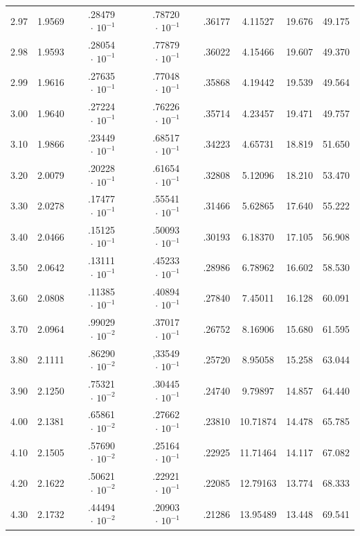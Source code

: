 \begin{minipage}{0.525\textwidth}
{\begin{tabular}{c|c|c|c|c|c|c|c}
        2.97 & 1.9569 & .28479$\,\cdot\,10^{-1}$ & .78720$\,\cdot\,10^{-1}$ & .36177 & 4.11527 & 19.676 & 49.175 \\
        2.98 & 1.9593 & .28054$\,\cdot\,10^{-1}$ & .77879$\,\cdot\,10^{-1}$ & .36022 & 4.15466 & 19.607 & 49.370 \\
        2.99 & 1.9616 & .27635$\,\cdot\,10^{-1}$ & .77048$\,\cdot\,10^{-1}$ & .35868 & 4.19442 & 19.539 & 49.564 \\
        3.00 & 1.9640 & .27224$\,\cdot\,10^{-1}$ & .76226$\,\cdot\,10^{-1}$ & .35714 & 4.23457 & 19.471 & 49.757 \\
        3.10 & 1.9866 & .23449$\,\cdot\,10^{-1}$ & .68517$\,\cdot\,10^{-1}$ & .34223 & 4.65731 & 18.819 & 51.650 \\
        3.20 & 2.0079 & .20228$\,\cdot\,10^{-1}$ & .61654$\,\cdot\,10^{-1}$ & .32808 & 5.12096 & 18.210 & 53.470 \\ \arrayrulecolor{Emerald}\hline\arrayrulecolor{black}
        3.30 & 2.0278 & .17477$\,\cdot\,10^{-1}$ & .55541$\,\cdot\,10^{-1}$ & .31466 & 5.62865 & 17.640 & 55.222 \\
        3.40 & 2.0466 & .15125$\,\cdot\,10^{-1}$ & .50093$\,\cdot\,10^{-1}$ & .30193 & 6.18370 & 17.105 & 56.908 \\
        3.50 & 2.0642 & .13111$\,\cdot\,10^{-1}$ & .45233$\,\cdot\,10^{-1}$ & .28986 & 6.78962 & 16.602 & 58.530 \\
        3.60 & 2.0808 & .11385$\,\cdot\,10^{-1}$ & .40894$\,\cdot\,10^{-1}$ & .27840 & 7.45011 & 16.128 & 60.091 \\
        3.70 & 2.0964 & .99029$\,\cdot\,10^{-2}$ & .37017$\,\cdot\,10^{-1}$ & .26752 & 8.16906 & 15.680 & 61.595 \\
        3.80 & 2.1111 & .86290$\,\cdot\,10^{-2}$ & ,33549$\,\cdot\,10^{-1}$ & .25720 & 8.95058 & 15.258 & 63.044 \\
        3.90 & 2.1250 & .75321$\,\cdot\,10^{-2}$ & .30445$\,\cdot\,10^{-1}$ & .24740 & 9.79897 & 14.857 & 64.440 \\
        4.00 & 2.1381 & .65861$\,\cdot\,10^{-2}$ & .27662$\,\cdot\,10^{-1}$ & .23810 & 10.71874 & 14.478 & 65.785 \\
        4.10 & 2.1505 & .57690$\,\cdot\,10^{-2}$ & .25164$\,\cdot\,10^{-1}$ & .22925 & 11.71464 & 14.117 & 67.082 \\
        4.20 & 2.1622 & .50621$\,\cdot\,10^{-2}$ & .22921$\,\cdot\,10^{-1}$ & .22085 & 12.79163 & 13.774 & 68.333 \\
        4.30 & 2.1732 & .44494$\,\cdot\,10^{-2}$ & .20903$\,\cdot\,10^{-1}$ & .21286 & 13.95489 & 13.448 & 69.541 \\

\end{tabular}}
\end{minipage}
